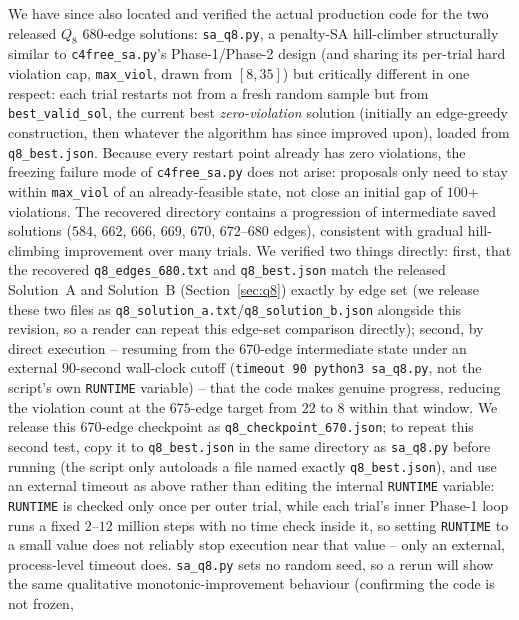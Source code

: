 \documentclass[12pt,a4paper]{article}
\theoremstyle{definition}
\begin{document}
We have since also located and verified the actual
production code for the two released $Q_8$ $680$-edge solutions:
\texttt{sa\_q8.py}, a penalty-SA hill-climber structurally similar to
\texttt{c4free\_sa.py}'s Phase-1/Phase-2 design (and sharing its
per-trial hard violation cap, \texttt{max\_viol}, drawn from
$[8,35]$) but critically different in one respect: each trial
restarts not from a fresh random sample but from \texttt{best\_valid\_sol},
the current best \emph{zero-violation} solution (initially an
edge-greedy construction, then whatever the algorithm has since
improved upon), loaded from \texttt{q8\_best.json}. Because every
restart point already has zero violations, the freezing failure mode
of \texttt{c4free\_sa.py} does not arise: proposals only need to stay
within \texttt{max\_viol} of an already-feasible state, not close an
initial gap of $100$+ violations. The recovered directory contains a
progression of intermediate saved solutions ($584$, $662$, $666$,
$669$, $670$, $672$--$680$ edges), consistent with gradual
hill-climbing improvement over many trials.
We verified two things directly: first, that the recovered
\texttt{q8\_edges\_680.txt} and \texttt{q8\_best.json} match the
released Solution~A and Solution~B (Section~\ref{sec:q8}) exactly by
edge set (we release these two files as
\texttt{q8\_solution\_a.txt}/\texttt{q8\_solution\_b.json} alongside
this revision, so a reader can repeat this edge-set comparison
directly); second, by direct execution -- resuming from the $670$-edge
intermediate state under an external $90$-second wall-clock cutoff
(\texttt{timeout 90 python3 sa\_q8.py}, not the script's own
\texttt{RUNTIME} variable) -- that the code makes
genuine progress, reducing the violation count at the $675$-edge
target from $22$ to $8$ within that window. We release
this $670$-edge checkpoint as \texttt{q8\_checkpoint\_670.json}; to
repeat this second test, copy it to \texttt{q8\_best.json} in the
same directory as \texttt{sa\_q8.py} before running (the script only
autoloads a file named exactly \texttt{q8\_best.json}), and use an
external timeout as above rather than editing the internal
\texttt{RUNTIME} variable: \texttt{RUNTIME} is checked only once per
outer trial, while each trial's inner Phase-1 loop runs a fixed
$2$--$12$ million steps with no time check inside it, so setting
\texttt{RUNTIME} to a small value does not reliably stop execution
near that value -- only an external, process-level timeout does.
\texttt{sa\_q8.py} sets no random seed,
so a rerun will show the same qualitative
monotonic-improvement behaviour (confirming the code is not frozen,
\end{document}
